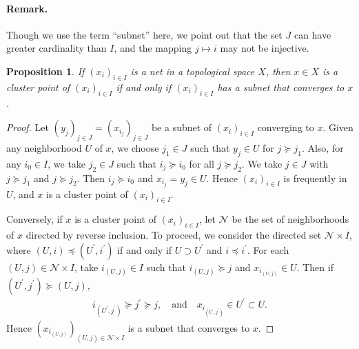\documentclass{article}
\numberwithin{equation}{section}
\theoremstyle{plain}
\newtheorem{proposition}[theorem]{Proposition}
\theoremstyle{definition}
\begin{document}
\paragraph{Remark.} Though we use the term ``subnet'' here, we point out that the set $J$ can have greater cardinality than $I$, and the mapping $j\mapsto i$ may not be injective.
\begin{proposition}
If $(x_i)_{i\in I}$ is a net in a topological space $X$, then $x\in X$ is a cluster point of $(x_i)_{i\in I}$ if and only if $(x_i)_{i\in I}$ has a subnet that converges to $x$.
\end{proposition}
\begin{proof}
Let $(y_j)_{j\in J}=(x_{i_j})_{j\in J}$ be a subnet of $(x_i)_{i\in I}$ converging to $x$. Given any neighborhood $U$ of $x$, we choose $j_1\in J$ such that $y_j\in U$ for $j\succeq j_1$. Also, for any $i_0\in I$, we take $j_2\in J$ such that $i_j\succeq i_0$ for all $j\succeq j_2$. We take $j\in J$ with $j\succeq j_1$ and $j\succeq j_2$. Then $i_j\succeq i_0$ and $x_{i_j}=y_j\in U$. Hence $(x_i)_{i\in I}$ is frequently in $U$, and $x$ is a cluster point of $(x_i)_{i\in I}$.

Conversely, if $x$ is a cluster point of $(x_i)_{i\in I}$, let $\mathscr{N}$ be the set of neighborhoods of $x$ directed by reverse inclusion. To proceed, we consider the directed set $\mathscr{N}\times I$, where $(U,i)\preceq (U^\prime,i^\prime)$ if and only if $U\supset U^\prime$ and $i\preceq i^\prime$. For each $(U,j)\in\mathscr{N}\times I$, take $i_{(U,j)}\in I$ such that $i_{(U,j)}\succeq j$ and $x_{i_{(U,j)}}\in U$. Then if $(U^\prime,j^\prime)\succeq(U,j)$,
\begin{align*}
	i_{(U^\prime,j^\prime)}\succeq j^\prime\succeq j,\quad \text{and}\quad x_{i_{(U^\prime,j^\prime)}}\in U^\prime\subset U.
\end{align*}
Hence $(x_{i_{(U,j)}})_{(U,j)\in\mathscr{N}\times I}$ is a subnet that converges to $x$.
\end{proof}
\end{document}
